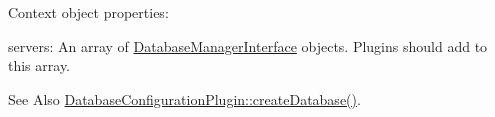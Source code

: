 Context object properties\-:
\begin{DoxyItemize}
\item {\ttfamily servers\-:} An array of \hyperlink{interfaceDatabaseManagerInterface}{Database\-Manager\-Interface} objects. Plugins should add to this array.
\end{DoxyItemize}

\begin{DoxySeeAlso}{See Also}
\hyperlink{classDatabaseConfigurationPlugin_aee48f5237d009c2dccb20485f175d887}{Database\-Configuration\-Plugin\-::create\-Database()}. 
\end{DoxySeeAlso}
